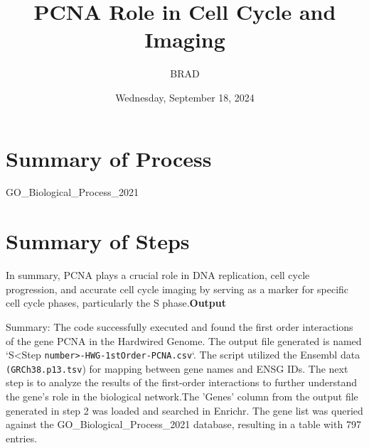 \documentclass{article}
\begin{document}
\title{PCNA Role in Cell Cycle and Imaging}
\date{Wednesday, September 18, 2024}
\author{BRAD}

\maketitle

\section*{Summary of Process}
GO\_Biological\_Process\_2021

\section*{Summary of Steps}

In summary, PCNA plays a crucial role in DNA replication, cell cycle progression, and accurate cell cycle imaging by serving as a marker for specific cell cycle phases, particularly the S phase.\textbf{Output}

Summary: The code successfully executed and found the first order interactions of the gene PCNA in the Hardwired Genome. The output file generated is named `S<Step \texttt{number>-HWG-1stOrder-PCNA.csv}`. The script utilized the Ensembl data \texttt{(GRCh38.p13.tsv}) for mapping between gene names and ENSG IDs. The next step is to analyze the results of the first-order interactions to further understand the gene's role in the biological network.The 'Genes' column from the output file generated in step 2 was loaded and searched in Enrichr. The gene list was queried against the GO\_Biological\_Process\_2021 database, resulting in a table with 797 entries.
\end{document}
